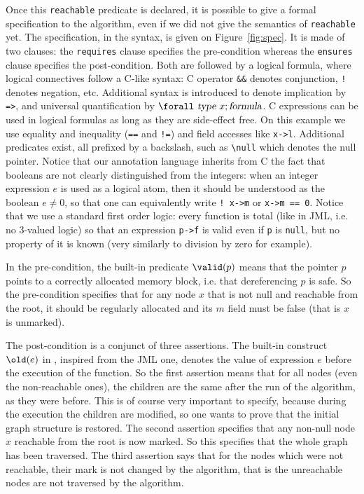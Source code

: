 Once this \texttt{reachable} predicate is declared, it is possible to
give a formal specification to the algorithm, even if we did not give
the semantics of \texttt{reachable} yet. The specification, in the
\caduceus{} syntax, is given on Figure~\ref{fig:spec}. It is made of
two clauses: the \texttt{requires} clause specifies the pre-condition
whereas the \texttt{ensures} clause specifies the post-condition. Both
are followed by a logical formula, where logical connectives follow a
C-like syntax: C operator \verb|&&| denotes conjunction, \verb|!|
denotes negation, etc. Additional syntax is introduced to denote
implication by \verb|=>|, and universal quantification by
$\bs{}\verb|forall|~\textsl{type}~x ; \textsl{formula}$. C expressions 
can be used in logical formulas as long as they are side-effect free. On this example we use equality and inequality (\verb|==| and
\verb|!=|) and field accesses like \verb|x->l|. Additional predicates
exist, all prefixed by a backslash, such as \verb|\null| which 
denotes the null pointer. Notice that our annotation language
inherits from C the fact that booleans are not clearly distinguished
from the integers: when an integer expression $e$ is used as a logical
atom, then it should be understood as the boolean $e\neq 0$, so that
one can equivalently write \verb|! x->m| or \verb|x->m == 0|. 
Notice that we use a standard first order logic: every function is
total (like in JML, i.e. no 3-valued logic) so that an expression
\verb|p->f| is valid even if \verb|p| is \verb|null|, but no
property of it is known (very similarly to division by zero for
example). 

In the pre-condition, the built-in predicate $\valid(p)$ means that
the pointer $p$ points to a correctly allocated memory block, i.e. that
dereferencing $p$ is safe. So the pre-condition specifies that for any
node $x$ that is not null and reachable from the root, it should be
regularly allocated and its $m$ field must be false (that is $x$ is
unmarked).

The post-condition is a conjunct of three assertions. The built-in
construct $\old(e)$ in \caduceus{}, inspired from the JML one, denotes
the value of expression $e$ before the execution of the function. So
the first assertion means that for all nodes (even the non-reachable
ones), the children are the same after the run of the algorithm, as
they were before. This is of course very important to specify, because
during the execution the children are modified, so one wants to prove
that the initial graph structure is restored. The second
assertion specifies that any non-null node $x$ reachable from the
root is now marked. So this specifies that the whole 
graph has been traversed. The third assertion says that for the nodes
which were not reachable, their mark is not changed by the algorithm,
that is the unreachable nodes are not traversed by the algorithm.

